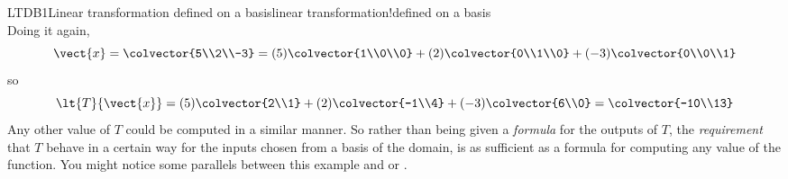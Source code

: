 \begin{example}{LTDB1}{Linear transformation defined on a basis}{linear transformation!defined on a basis}
\begin{equation*}
\end{equation*}
%
Doing it again,
%
\begin{equation*}
\vect{x}=\colvector{5\\2\\-3}=(5)\colvector{1\\0\\0}+(2)\colvector{0\\1\\0}+(-3)\colvector{0\\0\\1}
\end{equation*}
%
so
%
\begin{equation*}
\lt{T}{\vect{x}}=(5)\colvector{2\\1}+ (2)\colvector{-1\\4}+ (-3)\colvector{6\\0}=\colvector{-10\\13}
\end{equation*}
%
Any other value of $T$ could be computed in a similar manner.  So rather than being given a {\em formula} for the outputs of $T$, the {\em requirement} that $T$ behave in a certain way for the inputs chosen from a basis of the domain, is as sufficient as a formula for computing any value of the function.  You might notice some parallels between this example and  or .
%
\end{example}
%
